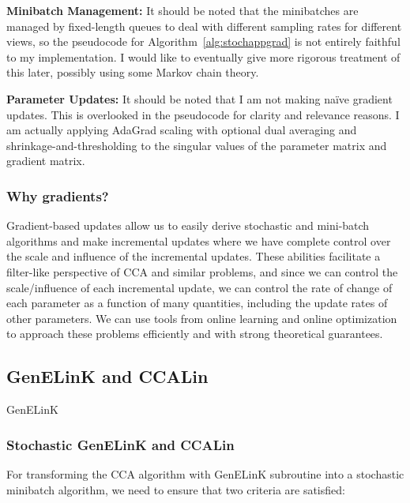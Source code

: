 \documentclass{article}
\begin{document}
	\noindent \textbf{Minibatch Management:} It should be noted that the minibatches are managed by fixed-length queues to deal with different sampling rates for different views, so the pseudocode for Algorithm~\ref{alg:stochappgrad} is not entirely faithful to my implementation. I would like to eventually give more rigorous treatment of this later, possibly using some Markov chain theory.
	
	\noindent \textbf{Parameter Updates:} It should be noted that I am not making na\"{i}ve gradient updates. This is overlooked in the pseudocode for clarity and relevance reasons. I am actually applying AdaGrad scaling with optional dual averaging and shrinkage-and-thresholding to the singular values of the parameter matrix and gradient matrix.
	
	\subsubsection{Why gradients?} \label{subsubsec:whygradients}
	Gradient-based updates allow us to easily derive stochastic and mini-batch algorithms and make incremental updates where we have complete control over the scale and influence of the incremental updates. These abilities facilitate a filter-like perspective of CCA and similar problems, and since we can control the scale/influence of each incremental update, we can control the rate of change of each parameter as a function of many quantities, including the update rates of other parameters. We can use tools from online learning and online optimization to approach these problems efficiently and with strong theoretical guarantees.
	
	\subsection{GenELinK and CCALin} \label{subsec:genelinkandccalin}
	
	\begin{algorithm}
	\caption{GenELinK} \label{alg:genelink}
	\begin{algorithmic}[1]
	\STATE
	\end{algorithmic}
	\end{algorithm}
	
	\subsubsection{Stochastic GenELinK and CCALin}
	For transforming the CCA algorithm with GenELinK subroutine into a stochastic minibatch algorithm, we need to ensure that two criteria are satisfied:
	
\end{document}
